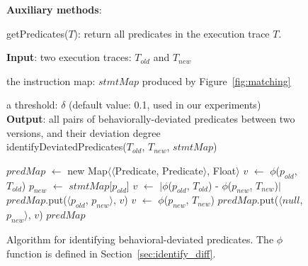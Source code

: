 \begin{figure}[t]

\textbf{Auxiliary methods}: 

\quad getPredicates($\mathit{T}$): return all predicates in the execution trace $\mathit{T}$.

\textbf{Input}: two execution traces: $\mathit{T_{old}}$ and $T_{new}$

\quad the instruction map: $\mathit{stmtMap}$ produced by Figure~\ref{fig:matching}

\quad a threshold: $\delta$ (default value: 0.1, used in our experiments)\\
\textbf{Output}: all pairs of behaviorally-deviated predicates between two versions, and their deviation degree\\
\vspace{-4mm}%
identifyDeviatedPredicates($\mathit{T_{old}}$, $\mathit{T_{new}}$, $\mathit{stmtMap}$)\\
\begin{algorithmic}[1]
\STATE $\mathit{predMap}$ $\leftarrow$ new Map$\langle$$\langle$Predicate, Predicate$\rangle$, Float$\rangle$
\STATE $\mathit{v}$ $\leftarrow$ $\phi$($\mathit{p_{old}}$, $\mathit{T_{old}}$)
\STATE $\mathit{p_{new}}$ $\leftarrow$ $\mathit{stmtMap}$[$\mathit{p_{old}}$]
\STATE $\mathit{v}$ $\leftarrow$ $|\phi$($\mathit{p_{old}}$, $\mathit{T_{old}}$) - $\phi$($\mathit{p_{new}}$, $\mathit{T_{new}}$)$|$
\ENDIF
{}
\STATE $\mathit{predMap}$.put($\langle$$\mathit{p_{old}}$, $p_{new}$$\rangle$, $\mathit{v}$)
\ENDIF
\ENDFOR
{}
\STATE $\mathit{v}$ $\leftarrow$ $\phi$($\mathit{p_{new}}$, $\mathit{T_{new}}$)
\STATE $\mathit{predMap}$.put($\langle$$\mathit{null}$, $p_{new}$$\rangle$, $\mathit{v}$)
\ENDIF
\ENDIF
\ENDFOR
\RETURN $\mathit{predMap}$
\end{algorithmic}
\vspace{-2mm}
\caption{Algorithm for identifying behavioral-deviated
predicates. The $\phi$ function is defined in Section~\ref{sec:identify_diff}.
\label{fig:identify}
}
\end{figure}

